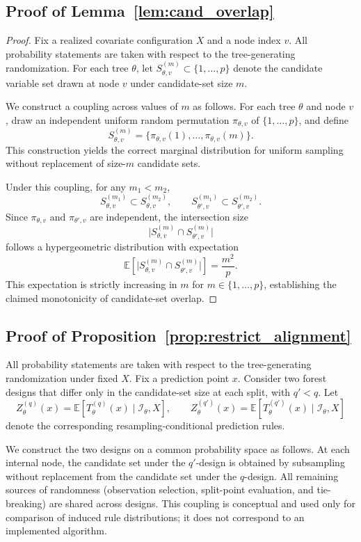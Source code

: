 \documentclass[11pt]{article}
\theoremstyle{plain}
\theoremstyle{definition}
\theoremstyle{remark}
\begin{document}
\subsection{Proof of Lemma~\ref{lem:cand_overlap}}
\label{app:proof_candidate_overlap}

\begin{proof}
	Fix a realized covariate configuration $X$ and a node index $v$. All probability statements are taken with respect to the tree-generating randomization. For each tree $\theta$, let $S^{(m)}_{\theta,v}\subset\{1,\dots,p\}$ denote the candidate variable set drawn at node $v$ under candidate-set size $m$.
	
	We construct a coupling across values of $m$ as follows. For each tree $\theta$ and node $v$, draw an independent uniform random permutation $\pi_{\theta,v}$ of $\{1,\dots,p\}$, and define
	\[
	S^{(m)}_{\theta,v}
	=
	\{\pi_{\theta,v}(1),\dots,\pi_{\theta,v}(m)\}.
	\]
	This construction yields the correct marginal distribution for uniform sampling without replacement of size-$m$ candidate sets.
	
	Under this coupling, for any $m_1<m_2$,
	\[
	S^{(m_1)}_{\theta,v}\subset S^{(m_2)}_{\theta,v},
	\qquad
	S^{(m_1)}_{\theta',v}\subset S^{(m_2)}_{\theta',v}.
	\]
	Since $\pi_{\theta,v}$ and $\pi_{\theta',v}$ are independent, the intersection size
	\[
	\bigl|S^{(m)}_{\theta,v}\cap S^{(m)}_{\theta',v}\bigr|
	\]
	follows a hypergeometric distribution with expectation
	\[
	\mathbb E\!\left[
	\bigl|S^{(m)}_{\theta,v}\cap S^{(m)}_{\theta',v}\bigr|
	\right]
	=
	\frac{m^2}{p}.
	\]
	This expectation is strictly increasing in $m$ for $m\in\{1,\dots,p\}$, establishing the claimed monotonicity of candidate-set overlap.
\end{proof}

\subsection{Proof of Proposition~\ref{prop:restrict_alignment}}
\label{app:proof_restrict_overlap}
All probability statements are taken with respect to the tree-generating randomization under fixed $X$.
Fix a prediction point $x$. Consider two forest designs that differ only in the candidate-set size at each split, with $q'<q$. Let
\[
Z_\theta^{(q)}(x)=\mathbb E[T_\theta^{(q)}(x)\mid \mathcal I_\theta, X],
\qquad
Z_\theta^{(q')}(x)=\mathbb E[T_\theta^{(q')}(x)\mid \mathcal I_\theta, X]
\]
denote the corresponding resampling-conditional prediction rules.

We construct the two designs on a common probability space as follows. At each internal node, the candidate set under the $q'$-design is obtained by subsampling without replacement from the candidate set under the $q$-design. All remaining sources of randomness (observation selection, split-point evaluation, and tie-breaking) are shared across designs. This coupling is conceptual and used only for comparison of induced rule distributions; it does not correspond to an implemented algorithm.
\end{document}
